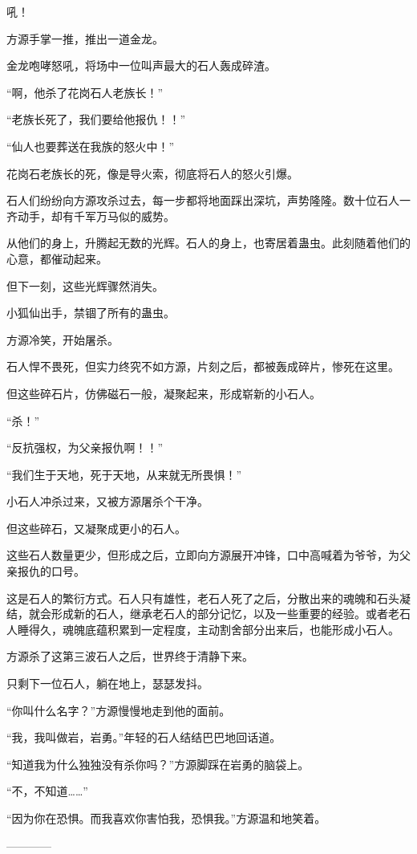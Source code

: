 \begin{this_body}
吼！

方源手掌一推，推出一道金龙。

金龙咆哮怒吼，将场中一位叫声最大的石人轰成碎渣。

“啊，他杀了花岗石人老族长！”

“老族长死了，我们要给他报仇！！”

“仙人也要葬送在我族的怒火中！”

花岗石老族长的死，像是导火索，彻底将石人的怒火引爆。

石人们纷纷向方源攻杀过去，每一步都将地面踩出深坑，声势隆隆。数十位石人一齐动手，却有千军万马似的威势。

从他们的身上，升腾起无数的光辉。石人的身上，也寄居着蛊虫。此刻随着他们的心意，都催动起来。

但下一刻，这些光辉骤然消失。

小狐仙出手，禁锢了所有的蛊虫。

方源冷笑，开始屠杀。

石人悍不畏死，但实力终究不如方源，片刻之后，都被轰成碎片，惨死在这里。

但这些碎石片，仿佛磁石一般，凝聚起来，形成崭新的小石人。

“杀！”

“反抗强权，为父亲报仇啊！！”

“我们生于天地，死于天地，从来就无所畏惧！”

小石人冲杀过来，又被方源屠杀个干净。

但这些碎石，又凝聚成更小的石人。

这些石人数量更少，但形成之后，立即向方源展开冲锋，口中高喊着为爷爷，为父亲报仇的口号。

这是石人的繁衍方式。石人只有雄性，老石人死了之后，分散出来的魂魄和石头凝结，就会形成新的石人，继承老石人的部分记忆，以及一些重要的经验。或者老石人睡得久，魂魄底蕴积累到一定程度，主动割舍部分出来后，也能形成小石人。

方源杀了这第三波石人之后，世界终于清静下来。

只剩下一位石人，躺在地上，瑟瑟发抖。

“你叫什么名字？”方源慢慢地走到他的面前。

“我，我叫做岩，岩勇。”年轻的石人结结巴巴地回话道。

“知道我为什么独独没有杀你吗？”方源脚踩在岩勇的脑袋上。

“不，不知道……”

“因为你在恐惧。而我喜欢你害怕我，恐惧我。”方源温和地笑着。

------------

\end{this_body}

